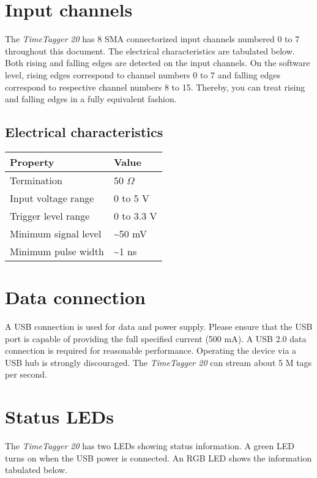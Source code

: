 \documentclass[letterpaper,10pt,english]{sphinxmanual}
\begin{document}
\section{Input channels}
\label{sections/hardware:input-channels}
The \emph{TimeTagger 20} has 8 SMA connectorized input channels numbered 0 to 7 throughout this document. The electrical
characteristics are tabulated below. Both rising and falling edges are detected on the input channels.
On the software level, rising edges correspond to channel numbers 0 to 7 and falling edges correspond to
respective channel numbers 8 to 15. Thereby, you can treat rising and falling edges in a fully equivalent fashion.


\subsection{Electrical characteristics}
\label{sections/hardware:electrical-characteristics}
\noindent\begin{tabulary}{\linewidth}{|L|L|}
\hline
\textsf{\relax 
Property
\unskip}\relax &\textsf{\relax 
Value
\unskip}\relax \\
\hline
Termination
&
50  \(\Omega\)
\\
\hline
Input voltage range
&
0 to 5 V
\\
\hline
Trigger level range
&
0 to 3.3 V
\\
\hline
Minimum signal level
&
\textasciitilde{}50 mV
\\
\hline
Minimum pulse width
&
\textasciitilde{}1 ns
\\
\hline\end{tabulary}



\section{Data connection}
\label{sections/hardware:data-connection}
A USB connection is used for data and power supply. Please ensure that the USB port is capable of providing the full
specified current (500 mA). A USB 2.0 data connection is required for reasonable performance. Operating the device via
a USB hub is strongly discouraged. The \emph{TimeTagger 20} can stream about 5 M tags per second.


\section{Status LEDs}
\label{sections/hardware:status-leds}
The \emph{TimeTagger 20} has two LEDs showing status information. A green LED turns on when the USB power is connected.
An RGB LED shows the information tabulated below.
\end{document}
